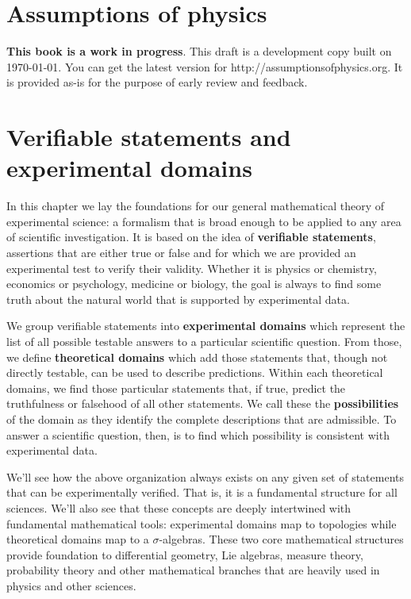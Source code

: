 \documentclass[11pt,letterpaper,fleqn]{memoir} %
\begin{document}
	




\chapter*{Assumptions of physics}

\textbf{This book is a work in progress}. This draft is a development copy built on \today. You can get the latest version for http://assumptionsofphysics.org. It is provided as-is for the purpose of early review and feedback. 

\chapter{Verifiable statements and experimental domains}

In this chapter we lay the foundations for our general mathematical theory of experimental science: a formalism that is broad enough to be applied to any area of scientific investigation. It is based on the idea of \textbf{verifiable statements}, assertions that are either true or false and for which we are provided an experimental test to verify their validity. Whether it is physics or chemistry, economics or psychology, medicine or biology, the goal is always to find some truth about the natural world that is supported by experimental data.

We group verifiable statements into \textbf{experimental domains} which represent the list of all possible testable answers to a particular scientific question. From those, we define \textbf{theoretical domains} which add those statements that, though not directly testable, can be used to describe predictions. Within each theoretical domains, we find those particular statements that, if true, predict the truthfulness or falsehood of all other statements. We call these the \textbf{possibilities} of the domain as they identify the complete descriptions that are admissible. To answer a scientific question, then, is to find which possibility is consistent with experimental data.

We'll see how the above organization always exists on any given set of statements that can be experimentally verified. That is, it is a fundamental structure for all sciences. We'll also see that these concepts are deeply intertwined with fundamental mathematical tools: experimental domains map to topologies while theoretical domains map to a $\sigma$-algebras. These two core mathematical structures provide foundation to differential geometry, Lie algebras, measure theory, probability theory and other mathematical branches that are heavily used in physics and other sciences.
\end{document}
